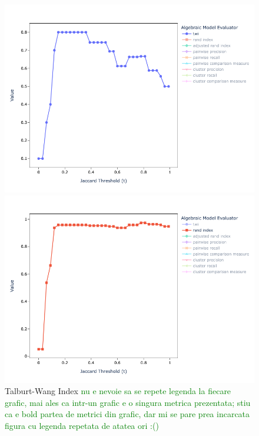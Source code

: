\documentclass[11pt]{article}
\begin{document}
    \begin{figure}
        \begin{minipage}{0.49\textwidth}
            \centering
            \includegraphics[width=\textwidth]{mini-alg-twi}
            \caption{Talburt-Wang Index
            \textcolor{green}{nu e nevoie sa se repete legenda la fiecare grafic, mai ales ca intr-un grafic e o singura metrica prezentata; stiu ca e bold partea de metrici din grafic, dar mi se pare prea incarcata figura cu legenda repetata de atatea ori :()}
            }
            \label{fig:mini-alg-twi}
        \end{minipage}    
        \begin{minipage}{0.49\textwidth}
            \centering
            \includegraphics[width=\textwidth]{mini-alg-rand}

\end{minipage}
\end{figure}
\end{document}
